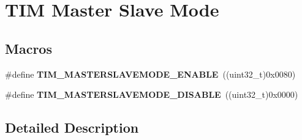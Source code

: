 \hypertarget{group___t_i_m___master___slave___mode}{\section{T\-I\-M Master Slave Mode}
\label{group___t_i_m___master___slave___mode}
}
\subsection*{Macros}
\begin{DoxyCompactItemize}
\item 
\hypertarget{group___t_i_m___master___slave___mode_gafdc0de07db4688aa8c87cf03220aaf28}{\#define {\bfseries T\-I\-M\-\_\-\-M\-A\-S\-T\-E\-R\-S\-L\-A\-V\-E\-M\-O\-D\-E\-\_\-\-E\-N\-A\-B\-L\-E}~((uint32\-\_\-t)0x0080)}\label{group___t_i_m___master___slave___mode_gafdc0de07db4688aa8c87cf03220aaf28}

\item 
\hypertarget{group___t_i_m___master___slave___mode_ga58ff99ef1d6d6f187e3615f9d3ec3b8b}{\#define {\bfseries T\-I\-M\-\_\-\-M\-A\-S\-T\-E\-R\-S\-L\-A\-V\-E\-M\-O\-D\-E\-\_\-\-D\-I\-S\-A\-B\-L\-E}~((uint32\-\_\-t)0x0000)}\label{group___t_i_m___master___slave___mode_ga58ff99ef1d6d6f187e3615f9d3ec3b8b}

\end{DoxyCompactItemize}


\subsection{Detailed Description}
